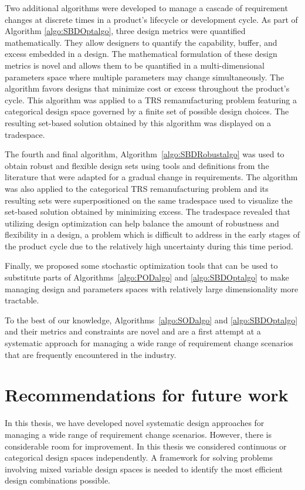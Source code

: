 Two additional algorithms were developed to manage a cascade of requirement chang\-es at discrete times in a product's lifecycle or development cycle. As part of Algorithm \ref{algo:SBDOptalgo}, three design metrics were quantified mathematically. They allow designers to quantify the capability, buffer, and excess embedded in a design. The mathematical formulation of these design metrics is novel and allows them to be quantified in a multi-dimensional parameters space where multiple parameters may change simultaneously. The algorithm favors designs that minimize cost or excess throughout the product's cycle. This algorithm was applied to a \ac{TRS} remanufacturing problem featuring a categorical design space governed by a finite set of possible design choices. The resulting set-based solution obtained by this algorithm was displayed on a tradespace.

The fourth and final algorithm, Algorithm~\ref{algo:SBDRobustalgo} was used to obtain robust and flexible design sets using tools and definitions from the literature that were adapted for a gradual change in requirements. The algorithm was also applied to the categorical \ac{TRS} remanufacturing problem and its resulting sets were superpositioned on the same tradespace used to visualize the set-based solution obtained by minimizing excess. The tradespace revealed that utilizing design optimization can help balance the amount of robustness and flexibility in a design, a problem which is difficult to address in the early stages of the product cycle due to the relatively high uncertainty during this time period.

Finally, we proposed some stochastic optimization tools that can be used to substitute parts of Algorithms~\ref{algo:PODalgo} and \ref{algo:SBDOptalgo} to make managing design and parameters spaces with relatively large dimensionality more tractable.

To the best of our knowledge, Algorithms~\ref{algo:SODalgo} and \ref{algo:SBDOptalgo} and their metrics and constraints are novel and are a first attempt at a systematic approach for managing a wide range of requirement change scenarios that are frequently encountered in the industry.

\section{Recommendations for future work}
\label{sec:futurework}

In this thesis, we have developed novel systematic design approaches for managing a wide range of requirement change scenarios. However, there is considerable room for improvement. In this thesis we considered continuous or categorical design spaces independently. A framework for solving problems involving mixed variable design spaces is needed to identify the most efficient design combinations possible. 

